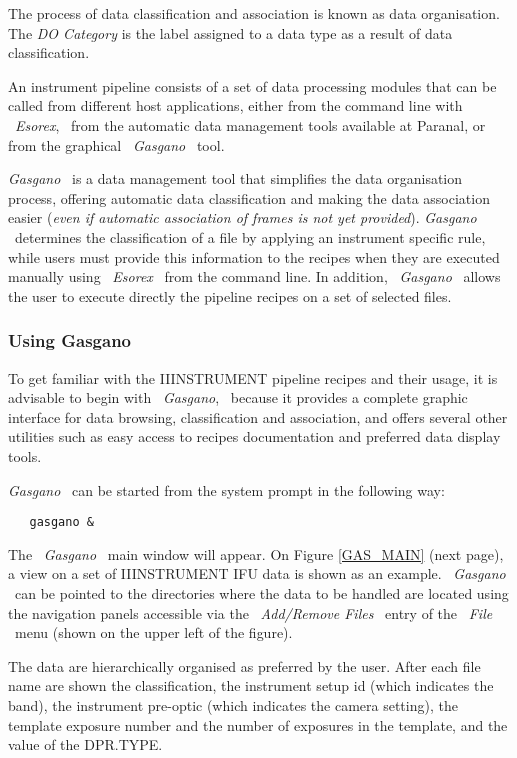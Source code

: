 The process of data classification and association is 
known as data organisation. The {\it DO Category} is the 
label assigned to a data type as a result of data classification.

An instrument pipeline consists of a set of data processing modules that
can be called from different host applications, either from the command
line with \ {\it Esorex}, \ from the automatic data management tools 
available at Paranal, or from the graphical \ {\it Gasgano} \ tool.

{\it Gasgano} \ is a data management tool that simplifies the data 
organisation process, offering automatic data classification and making
the data association easier ({\it even if automatic association of frames is 
not yet provided}). {\it Gasgano} \ determines the classification of a file
by applying an instrument specific rule, while users must provide this
information to the recipes when they are executed manually using
\ {\it Esorex} \ from the command line. In addition, 
\ {\it Gasgano} \ allows the user to execute 
directly the pipeline recipes on a set of selected files. 

\subsubsection{Using Gasgano}
\label{GASGANO}


 
To get familiar with the IIINSTRUMENT pipeline recipes and their usage, it 
is advisable to begin with \ {\it Gasgano}, \ because it provides
a complete graphic interface for data browsing, classification and 
association, and offers several other utilities such as easy access 
to recipes documentation and preferred data display tools.

{\it Gasgano} \ can be started from the system prompt in the following way:

\begin{verbatim}
   gasgano &
\end{verbatim}


The \ {\it Gasgano} \ main window will appear. On Figure \ref{GAS_MAIN}
(next page), a view on a set of IIINSTRUMENT IFU data is shown as an 
example. \ {\it Gasgano} \ can 
be pointed to the directories where the data to be handled are located
using the navigation panels accessible via the \ {\it Add/Remove Files} \
entry of the \ {\it File} \ menu (shown on the upper left of the figure). 

The data are hierarchically organised as preferred by the user.
After each file name are shown the classification, 
the instrument setup id (which indicates the band), the instrument 
pre-optic (which indicates the camera setting), the template exposure 
number and the number of exposures in the template, and the value 
of the DPR.TYPE. 

